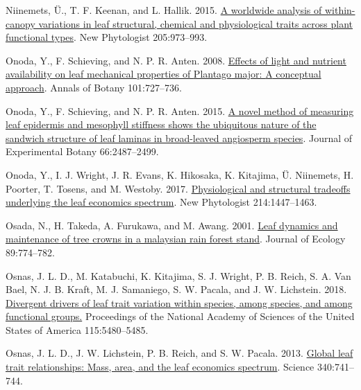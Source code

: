 \documentclass[
  12pt,
]{article}
\newlength{\cslhangindent} %
\newlength{\cslentryspacingunit} %
\newenvironment{CSLReferences}[2] %
 {%
  \setlength{\parindent}{0pt} %
  \ifodd #1 %
  \let\oldpar\par %
  \def\par{\hangindent=\cslhangindent\oldpar} %
  \fi %
  \setlength{\parskip}{#2\cslentryspacingunit} %
 }%
 {} %
\begin{document}
\begin{CSLReferences}{1}{0}
\leavevmode{}%
Niinemets, Ü., T. F. Keenan, and L. Hallik. 2015. \href{https://doi.org/10.1111/nph.13096}{A worldwide analysis of within-canopy variations in leaf structural, chemical and physiological traits across plant functional types}. New Phytologist 205:973--993.

\leavevmode{}%
Onoda, Y., F. Schieving, and N. P. R. Anten. 2008. \href{https://doi.org/10.1093/aob/mcn013}{Effects of light and nutrient availability on leaf mechanical properties of {Plantago} major: {A} conceptual approach}. Annals of Botany 101:727--736.

\leavevmode{}%
Onoda, Y., F. Schieving, and N. P. R. Anten. 2015. \href{https://doi.org/10.1093/jxb/erv024}{A novel method of measuring leaf epidermis and mesophyll stiffness shows the ubiquitous nature of the sandwich structure of leaf laminas in broad-leaved angiosperm species}. Journal of Experimental Botany 66:2487--2499.

\leavevmode{}%
Onoda, Y., I. J. Wright, J. R. Evans, K. Hikosaka, K. Kitajima, Ü. Niinemets, H. Poorter, T. Tosens, and M. Westoby. 2017. \href{https://doi.org/10.1111/nph.14496}{Physiological and structural tradeoffs underlying the leaf economics spectrum}. New Phytologist 214:1447--1463.

\leavevmode{}%
Osada, N., H. Takeda, A. Furukawa, and M. Awang. 2001. \href{https://doi.org/10.1046/j.0022-0477.2001.00590.x}{Leaf dynamics and maintenance of tree crowns in a malaysian rain forest stand}. Journal of Ecology 89:774--782.

\leavevmode{}%
Osnas, J. L. D., M. Katabuchi, K. Kitajima, S. J. Wright, P. B. Reich, S. A. Van Bael, N. J. B. Kraft, M. J. Samaniego, S. W. Pacala, and J. W. Lichstein. 2018. \href{https://doi.org/10.1073/pnas.1803989115}{Divergent drivers of leaf trait variation within species, among species, and among functional groups.} Proceedings of the National Academy of Sciences of the United States of America 115:5480--5485.

\leavevmode{}%
Osnas, J. L. D., J. W. Lichstein, P. B. Reich, and S. W. Pacala. 2013. \href{https://doi.org/10.1126/science.1231574}{Global leaf trait relationships: {Mass}, area, and the leaf economics spectrum}. Science 340:741--744.


\end{CSLReferences}
\end{document}
